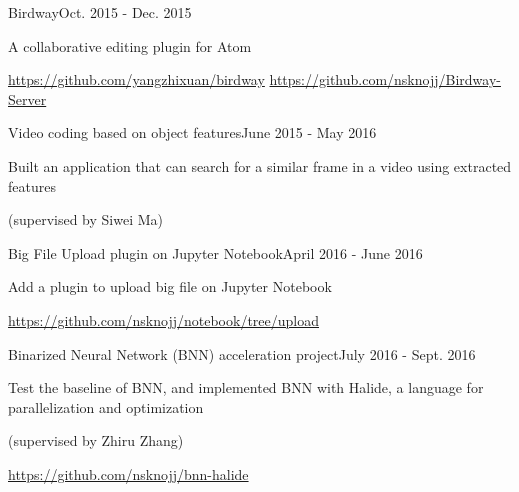 \documentclass{joel_cv}
\begin{document}
\begin{sectionContentSimple}{Birdway}{Oct. 2015 - Dec. 2015}
\item A collaborative editing plugin for Atom
\item \url{https://github.com/yangzhixuan/birdway} \quad \url{https://github.com/nsknojj/Birdway-Server}
\end{sectionContentSimple}

\begin{sectionContentSimple}{Video coding based on object features}{June 2015 - May 2016}
\item Built an application that can search for a similar frame in a video using extracted features
\item (supervised by Siwei Ma)
\end{sectionContentSimple}

\begin{sectionContentSimple}{Big File Upload plugin on Jupyter Notebook}{April 2016 - June 2016}
\item Add a plugin to upload big file on Jupyter Notebook
\item \url{https://github.com/nsknojj/notebook/tree/upload}
\end{sectionContentSimple}

\begin{sectionContentSimple}{Binarized Neural Network (BNN) acceleration project}{July 2016 - Sept. 2016}
\item Test the baseline of BNN, and implemented BNN with Halide, a language for parallelization and optimization
\item (supervised by Zhiru Zhang)
\item \url{https://github.com/nsknojj/bnn-halide}
\end{sectionContentSimple}

%
%
\end{document}
